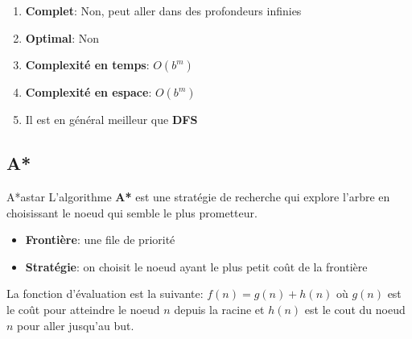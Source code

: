 \documentclass[a4paper, 12pt]{extarticle}
\begin{document}
\begin{remarks}\leavevmode
    \begin{enumerate}
        \item \textbf{Complet}: Non, peut aller dans des profondeurs infinies
        \item \textbf{Optimal}: Non
        \item \textbf{Complexité en temps}: $O(b^m)$
        \item \textbf{Complexité en espace}: $O(b^m)$
        \item Il est en général meilleur que \textbf{DFS}
    \end{enumerate}
\end{remarks}


\subsection{A*} %
\label{sub:a_}

\begin{definition}{A*}{astar}
    L'algorithme \textbf{A*} est une stratégie de recherche qui explore l'arbre en choisissant le noeud qui semble le plus prometteur.
    \begin{itemize}
        \item \textbf{Frontière}: une file de priorité
        \item \textbf{Stratégie}: on choisit le noeud ayant le plus petit coût de la frontière
    \end{itemize} 
    La fonction d'évaluation est la suivante: 
    \begin{math}
        f(n) = g(n) + h(n)
    \end{math} 
    où $g(n)$ est le coût pour atteindre le noeud $n$ depuis la racine et 
    $h(n)$ est le cout du noeud $n$ pour aller jusqu'au but.
\end{definition}
\end{document}
